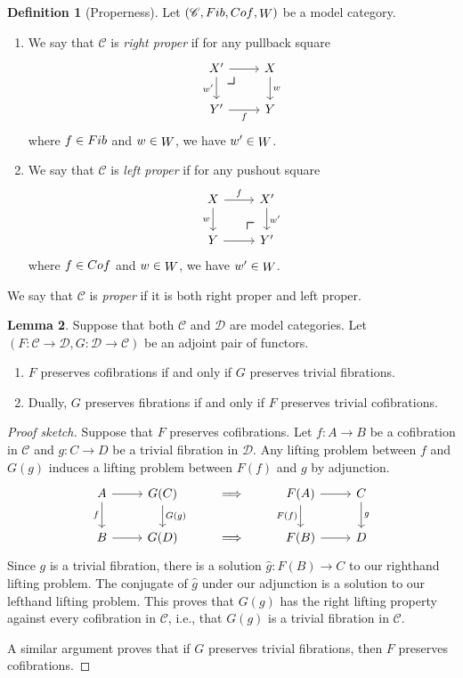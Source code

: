 \documentclass[10pt,letterpaper,cm]{nupset}
\theoremstyle{definition}
\newtheorem{definition}{Definition}[subsection]
\theoremstyle{theorem}
\newtheorem{lemma}[definition]{Lemma}
\theoremstyle{remark}
\newcommand{\0}{\mathbf{0}}
\newcommand{\1}{\mathbf{1}}
\newcommand{\2}{\mathbf{2}}
\renewcommand{\c}{\mathscr{C}}
\renewcommand{\d}{\mathscr{D}}
\DeclareMathOperator{\fib}{\mathnormal{Fib}}
\DeclareMathOperator{\cof}{\mathnormal{Cof}}
\DeclareMathOperator{\we}{\mathnormal{W}}
\newcommand{\be}{\begin{enumerate}}
\newcommand{\ee}{\end{enumerate}}
\begin{document}
\smallskip

\begin{definition}[Properness] Let $\left(\c, \fib, \cof, \we\right)$ be a model category.
\be
\item We say that $\c$ is \textit{right proper} if for any pullback square
\[
\begin{tikzcd}
X' \arrow[r]
\arrow[dr, phantom, "\scalebox{1.5}{\color{black}$\lrcorner$}" , very near start, color=black]
 \arrow[d, "w'"'] & X \arrow[d, "w"] \\
Y' \arrow[r, "f"']            & Y               
\end{tikzcd}
\] where $f\in \fib$ and $w \in \we$, we have $w' \in \we$. 
\item We say that $\c$ is \textit{left proper} if for any pushout square
\[
\begin{tikzcd}
X \arrow[r, "f"]
 \arrow[dr, phantom, "\scalebox{1.5}{\color{black}$\ulcorner$}", very near end, color=black]
 \arrow[d, "w"'] & X' \arrow[d, "w'"] \\
Y \arrow[r]            & Y'               
\end{tikzcd}
\] where $f\in \cof$ and $w \in \we$, we have $w' \in \we$. 
\ee
We say that $\c$ is \textit{proper} if it is both right proper and left proper.
\end{definition}

\medskip

\begin{lemma}\label{trivcofp} Suppose that both $\c$ and $\d$ are model categories. Let $\left(F: \c \to \d, G :\d \to \c \right)$ be an adjoint pair of functors.
\be[label=(\alph*)]
\item $F$ preserves cofibrations if and only if $G$ preserves trivial fibrations.
\item Dually, $G$ preserves fibrations if and only if $F$ preserves trivial cofibrations.
\ee 
\end{lemma}
\begin{proof}[Proof sketch] 
Suppose that $F$ preserves cofibrations. Let $f:A \to B$ be a cofibration in $\c$ and $g: C\to D$ be a trivial fibration in $\d$. Any lifting problem between $f$ and $G(g)$ induces a lifting problem between $F(f)$ and $g$ by adjunction.
\[
\begin{tikzcd}
A \arrow[r] \arrow[d, "f"'] & G(C) \arrow[d, "G(g)"] & \implies & F(A) \arrow[r] \arrow[d, "F(f)"'] & C \arrow[d, "g"] \\
B \arrow[r]                 & G(D)                   & \implies & F(B) \arrow[r]                    & D               
\end{tikzcd}
\] Since $g$ is a trivial fibration, there is a solution $\hat{g} : F(B) \to C$ to our righthand lifting problem. The conjugate of $\hat{g}$ under our adjunction is a solution to our lefthand lifting problem. This proves that $G(g)$ has the right lifting property against every cofibration in $\c$, i.e., that $G(g)$ is a trivial fibration in $\c$.

\smallskip 

A similar argument proves that if $G$ preserves trivial fibrations, then $F$ preserves cofibrations. 
\end{proof}
\end{document}
